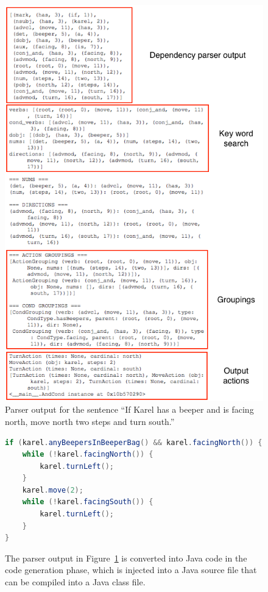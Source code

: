 \documentclass[11pt]{article}
\begin{document}
\begin{figure}[ht]
\centering
\includegraphics[width=\columnwidth]{parse-output.png}
\caption{Parser output for the sentence ``If Karel has a beeper and is facing north, move north two
steps and turn south.''}
\label{fig:parse-output}
\end{figure}

\begin{figure}[ht]
\begin{lstlisting}[language=java]
if (karel.anyBeepersInBeeperBag() && karel.facingNorth()) {
    while (!karel.facingNorth()) {
        karel.turnLeft();
    }
    karel.move(2);
    while (!karel.facingSouth()) {
        karel.turnLeft();
    }
}
\end{lstlisting}
\label{fig:injected-code}
\caption{The parser output in Figure~\ref{fig:parse-output} is converted into Java code in the code
generation phase, which is injected into a Java source file that can be compiled into a Java class
file.}
\end{figure}
\end{document}
